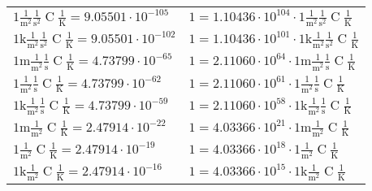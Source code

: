 \begin{center}
\begin{longtable}{l l}
{\color{black}$1 \bm{\mathrm{ }}\frac1{\operatorname{m}^2}\frac1{\operatorname{s}^2}{\operatorname{C}}\frac1{\operatorname{K}} = 9.05501\cdot10^{-105} $}   & {\color{black}$ 1 = 1.10436\cdot10^{104} \cdot 1 \bm{\mathrm{ }}\frac1{\operatorname{m}^2}\frac1{\operatorname{s}^2}{\operatorname{C}}\frac1{\operatorname{K}}$}  \\
{\color{gray}$1 \bm{\mathrm{ k}}\frac1{\operatorname{m}^2}\frac1{\operatorname{s}^2}{\operatorname{C}}\frac1{\operatorname{K}} = 9.05501\cdot10^{-102} $}   & {\color{gray}$ 1 = 1.10436\cdot10^{101} \cdot 1 \bm{\mathrm{ k}}\frac1{\operatorname{m}^2}\frac1{\operatorname{s}^2}{\operatorname{C}}\frac1{\operatorname{K}}$}  \\
{\color{gray}$1 \bm{\mathrm{ m}}\frac1{\operatorname{m}^2}\frac1{\operatorname{s}}{\operatorname{C}}\frac1{\operatorname{K}} = 4.73799\cdot10^{-65} $}   & {\color{gray}$ 1 = 2.11060\cdot10^{64} \cdot 1 \bm{\mathrm{ m}}\frac1{\operatorname{m}^2}\frac1{\operatorname{s}}{\operatorname{C}}\frac1{\operatorname{K}}$}  \\
{\color{black}$1 \bm{\mathrm{ }}\frac1{\operatorname{m}^2}\frac1{\operatorname{s}}{\operatorname{C}}\frac1{\operatorname{K}} = 4.73799\cdot10^{-62} $}   & {\color{black}$ 1 = 2.11060\cdot10^{61} \cdot 1 \bm{\mathrm{ }}\frac1{\operatorname{m}^2}\frac1{\operatorname{s}}{\operatorname{C}}\frac1{\operatorname{K}}$}  \\
{\color{gray}$1 \bm{\mathrm{ k}}\frac1{\operatorname{m}^2}\frac1{\operatorname{s}}{\operatorname{C}}\frac1{\operatorname{K}} = 4.73799\cdot10^{-59} $}   & {\color{gray}$ 1 = 2.11060\cdot10^{58} \cdot 1 \bm{\mathrm{ k}}\frac1{\operatorname{m}^2}\frac1{\operatorname{s}}{\operatorname{C}}\frac1{\operatorname{K}}$}  \\
{\color{gray}$1 \bm{\mathrm{ m}}\frac1{\operatorname{m}^2}{}{\operatorname{C}}\frac1{\operatorname{K}} = 2.47914\cdot10^{-22} $}   & {\color{gray}$ 1 = 4.03366\cdot10^{21} \cdot 1 \bm{\mathrm{ m}}\frac1{\operatorname{m}^2}{}{\operatorname{C}}\frac1{\operatorname{K}}$}  \\
{\color{black}$1 \bm{\mathrm{ }}\frac1{\operatorname{m}^2}{}{\operatorname{C}}\frac1{\operatorname{K}} = 2.47914\cdot10^{-19} $}   & {\color{black}$ 1 = 4.03366\cdot10^{18} \cdot 1 \bm{\mathrm{ }}\frac1{\operatorname{m}^2}{}{\operatorname{C}}\frac1{\operatorname{K}}$}  \\
{\color{gray}$1 \bm{\mathrm{ k}}\frac1{\operatorname{m}^2}{}{\operatorname{C}}\frac1{\operatorname{K}} = 2.47914\cdot10^{-16} $}   & {\color{gray}$ 1 = 4.03366\cdot10^{15} \cdot 1 \bm{\mathrm{ k}}\frac1{\operatorname{m}^2}{}{\operatorname{C}}\frac1{\operatorname{K}}$}  \\

\end{longtable}
\end{center}
